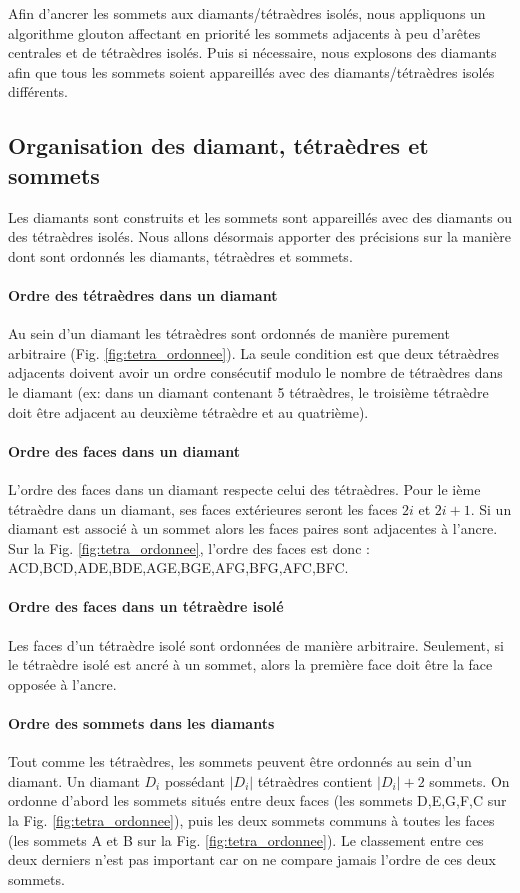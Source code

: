 \noindent
Afin d'ancrer les sommets aux diamants/tétraèdres isolés, nous appliquons un algorithme glouton affectant en priorité les sommets adjacents à peu d'arêtes centrales et de tétraèdres isolés. Puis si nécessaire, nous explosons des diamants afin que tous les sommets soient appareillés avec des diamants/tétraèdres isolés différents.

\subsection{Organisation des diamant, tétraèdres et sommets}
\noindent
Les diamants sont construits et les sommets sont appareillés avec des diamants ou des tétraèdres isolés. Nous allons désormais apporter des précisions sur la manière dont sont ordonnés les diamants, tétraèdres et sommets.
\paragraph{Ordre des tétraèdres dans un diamant}
Au sein d'un diamant les tétraèdres sont ordonnés de manière purement arbitraire (Fig. \ref{fig:tetra_ordonnee}). La seule condition est que deux tétraèdres adjacents doivent avoir un ordre consécutif modulo le nombre de tétraèdres dans le diamant (ex: dans un diamant contenant 5 tétraèdres, le troisième tétraèdre doit être adjacent au deuxième tétraèdre et au quatrième).
\paragraph{Ordre des faces dans un diamant}
L'ordre des faces dans un diamant respecte celui des tétraèdres. Pour le ième tétraèdre dans un diamant, ses faces extérieures seront les faces $2i$ et $2i+1$. Si un diamant est associé à un sommet alors les faces paires sont adjacentes à l'ancre. Sur la Fig. \ref{fig:tetra_ordonnee}, l'ordre des faces est donc : ACD,BCD,ADE,BDE,AGE,BGE,AFG,BFG,AFC,BFC.
\paragraph{Ordre des faces dans un tétraèdre isolé}
Les faces d'un tétraèdre isolé sont ordonnées de manière arbitraire. Seulement, si le tétraèdre isolé est ancré à un sommet, alors la première face doit être la face opposée à l'ancre.
\paragraph{Ordre des sommets dans les diamants}
\label{Ordre des sommets dans les diamants}Tout comme les tétraèdres, les sommets peuvent être ordonnés au sein d'un diamant. Un diamant $D_i$ possédant $|D_i|$ tétraèdres contient $|D_i|+2$ sommets. On ordonne d'abord les sommets situés entre deux faces (les sommets D,E,G,F,C sur la Fig. \ref{fig:tetra_ordonnee}), puis les deux sommets communs à toutes les faces (les sommets A et B sur la Fig. \ref{fig:tetra_ordonnee}). Le classement entre ces deux derniers n'est pas important car on ne compare jamais l'ordre de ces deux sommets.

